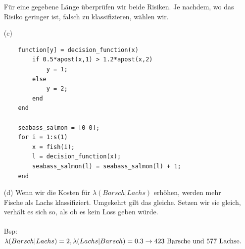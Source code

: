 \documentclass[a4paper]{scrartcl}
\begin{document}
\begin{itemize}
	Für eine gegebene Länge überprüfen wir beide Risiken. Je nachdem, wo das Risiko geringer ist, falsch zu klassifizieren, wählen wir.
	
	
	
	
		\item[(c)] 
	
	\begin{lstlisting}
	function[y] = decision_function(x)
		if 0.5*apost(x,1) > 1.2*apost(x,2)
			y = 1;
		else
			y = 2;
		end
	end
	
	seabass_salmon = [0 0];
	for i = 1:s(1)
		x = fish(i);
		l = decision_function(x);
		seabass_salmon(l) = seabass_salmon(l) + 1;
	end
	\end{lstlisting}
	
	
	\item[(d)] Wenn wir die Kosten für $\lambda(Barsch|Lachs)$ erhöhen, werden mehr Fische als Lachs klassifiziert. Umgekehrt gilt das gleiche.
	Setzen wir sie gleich, verhält es sich so, als ob es kein Loss geben würde.\\\\
	Bsp:\\
	$\lambda(Barsch|Lachs) = 2, \lambda(Lachs|Barsch) = 0.3\\
	\rightarrow \text{423 Barsche und 577 Lachse.}$
	
	
\end{itemize}
\end{document}
